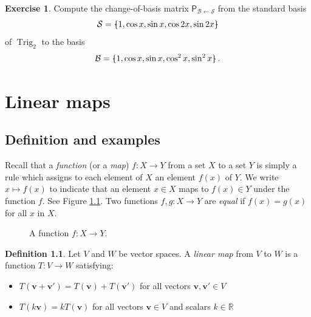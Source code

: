 \documentclass[a4paper,11pt]{book}
\theoremstyle{definition}
\newtheorem{definition}[theorem]{Definition}
\newtheorem{exercise}{Exercise}
\newcommand{\ve}[1]{\mathbf{#1}}
\newcommand{\mat}[1]{\mathsf{#1}}
\newcommand{\basis}[1]{{\mathcal #1}}
\newcommand{\bmark}{\raisebox{.53ex}{\rule{.2em}{.1ex}}}
\newcommand{\bopen}{{\protect\ooalign{\{\cr\hfil\bmark\hfil\cr}}}
\newcommand{\bclose}{{\protect\ooalign{\}\cr\hfil\bmark\hfil\cr}}}
\DeclareMathOperator{\Trig}{Trig}
\begin{document}
\begin{exercise}
Compute the change-of-basis matrix $\mat{P}_{\basis{B} \leftarrow \basis{S}}$ from the standard basis
\[
 \basis{S} = \bopen 1, \cos x, \sin x, \cos 2x, \sin 2x \bclose 
\]
of $\Trig_2$ to the basis 
\[
 \basis{B} = \bopen 1, \cos x, \sin x, \cos^2 x, \sin^2 x \bclose \, .
\]
\end{exercise}


\chapter{Linear maps} \label{Ch3LinearMaps}

\section{Definition and examples} \label{Ch3Sec1DefinitionsExamples}

Recall that a {\em function} (or a {\em map}) $f : X \rightarrow Y$ from a set $X$ to a set $Y$ is simply a rule which assigns to each element of $X$ an element $f(x)$ of $Y$. We write $x \mapsto f(x)$ to indicate that an element $x \in X$ maps to $f(x) \in Y$ under the function $f$.  See Figure \ref{explanation_of_mapsto}. Two functions $f, g : X \rightarrow Y$ are {\em equal} if $f(x) = g(x)$ for all $x$ in $X$. 



\begin{figure}[h]
	\centering
	\caption{\label{explanation_of_mapsto} A function $f : X \rightarrow Y$.}
\end{figure}



\begin{definition} Let $V$ and $W$ be vector spaces. A {\em linear map} from $V$ to $W$ is a function $T : V \rightarrow W$ satisfying:
\begin{itemize}
 \item  $T(\ve{v} + \ve{v}') = T(\ve{v}) + T(\ve{v}')$ for all vectors $\ve{v}, \ve{v}' \in V$
 \item $T(k \ve{v}) = k T (\ve{v})$ for all vectors $\ve{v} \in V$ and scalars $k \in \mathbb{R}$ 
\end{itemize}
\end{definition}
\end{document}
